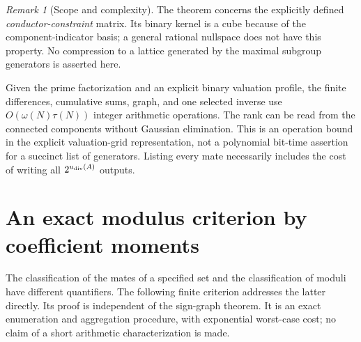 \documentclass[11pt]{article}
\numberwithin{equation}{section}
\theoremstyle{definition}
\theoremstyle{remark}
\newtheorem{remark}[theorem]{Remark}
\begin{document}
\begin{remark}[Scope and complexity]\label{v2:rem:rank-scope}
The theorem concerns the explicitly defined \emph{conductor-constraint} matrix. Its binary kernel is a cube because of the component-indicator basis; a general rational nullspace does not have this property. No compression to a lattice generated by the maximal subgroup generators is asserted here.

Given the prime factorization and an explicit binary valuation profile, the finite differences, cumulative sums, graph, and one selected inverse use $O(\omega(N)\tau(N))$ integer arithmetic operations. The rank can be read from the connected components without Gaussian elimination. This is an operation bound in the explicit valuation-grid representation, not a polynomial bit-time assertion for a succinct list of generators. Listing every mate necessarily includes the cost of writing all $2^{u_{\rm div}(A)}$ outputs.
\end{remark}



\section{An exact modulus criterion by coefficient moments}
\label{v2:sec:moments}

The classification of the mates of a specified set and the classification of
moduli have different quantifiers.  The following finite criterion addresses
the latter directly.  Its proof is independent of the sign-graph theorem.  It
is an exact enumeration and aggregation procedure, with exponential worst-case
cost; no claim of a short arithmetic characterization is made.
\end{document}
